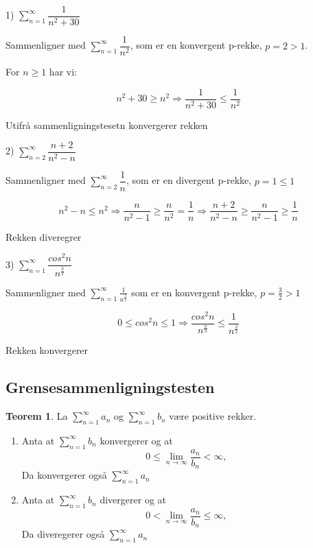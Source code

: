 \documentclass[11pt]{article}
\theoremstyle{definition}
\theoremstyle{definition}
\theoremstyle{definition}
\theoremstyle{definition}
\newtheorem{teo}{Teorem}[section]
\newenvironment{fteo}
{\begin{mdframed}[style=minstil]\begin{teo}}
		{\end{teo}\end{mdframed}}
\theoremstyle{definition}
\theoremstyle{definition}
\begin{document}
		 1) \( \displaystyle{\sum_{n=1}^{\infty}} \dfrac{1}{n^2 +30} \)
		 
		 Sammenligner med \(\displaystyle{\sum_{n=1}^{\infty} \dfrac{1}{n^2} } \), som er en konvergent p-rekke, \(p=2>1\). 
		 
		 For \(n\geq 1 \) har vi:
		 
		 \[n^2 + 30 \geq n^2 \Rightarrow \dfrac{1}{n^2+30} \leq \dfrac{1}{n^2} \]
		 
		 Utifrå sammenligningstesetn konvergerer rekken
		 
		 2) \(\displaystyle{\sum_{n=2}^{\infty}} \dfrac{n+2}{n^2-n}\)
		 
		 Sammenligner med \(\displaystyle{\sum_{n=2}^{\infty}\dfrac{1}{n}} \), som er en divergent p-rekke, \(p=1\leq1\)
		 
		 \[n^2-n \leq n^2 \Rightarrow \dfrac{n}{n^2-1} \geq \dfrac{n}{n^2}=\dfrac{1}{n} \Rightarrow \dfrac{n+2}{n^2-n} \geq \dfrac{n}{n^2-1} \geq \frac{1}{n} \]
		 
		 Rekken diveregrer
		 
		 3) \(\displaystyle{\sum_{n=1}^{\infty}} \dfrac{cos^2n}{n^{\frac{3}{2}}} \)
		 
		  Sammenligner med \(\displaystyle{\sum_{n=1}^{\infty}\frac{1}{n^{\frac{3}{2}}}} \) som er en konvergent p-rekke, \(p=\frac{3}{2}>1\) 
		  
		  \[0\leq cos^2n \leq 1 \Rightarrow \dfrac{cos^2n}{n^{\frac{n}{3}}}\leq \dfrac{1}{n^{\frac{3}{2}}} \]
		  
		  Rekken konvergerer
		 \newpage
		 
		 \subsection{Grensesammenligningstesten}
		 
		 \begin{fteo}
		 	La \(\displaystyle{\sum_{n=1}^{\infty}a_n}\) og \(\displaystyle{\sum_{n=1}^{\infty}b_n}\) være positive rekker.
		 	\begin{enumerate}
		 		\item Anta at \(\displaystyle{\sum_{n=1}^{\infty}b_n}\) konvergerer og at \[0\leq \lim\limits_{n\rightarrow \infty}\dfrac{a_n}{b_n}<\infty,\] Da konvergerer også \(\displaystyle{\sum_{n=1}^{\infty}a_n}\)
		 		\item Anta at \(\displaystyle{\sum_{n=1}^{\infty}b_n}\) divergerer og at \[0<\lim\limits_{n\rightarrow \infty}\dfrac{a_n}{b_n}\leq \infty,\]Da diveregerer også \(\displaystyle{\sum_{n=1}^{\infty}a_n}\)
		 	\end{enumerate}
		 \end{fteo}
		 
\end{document}
